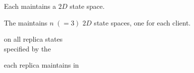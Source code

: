 \begin{frame}{}
  \centerline{\large Each  maintains a $2D$ state space.}


  \centerline{\large The  maintains $n \; (=3)$ $2D$ state spaces, one for each client.}
\end{frame}

\begin{frame}{}
  \begin{center}
    {\large {} on all replica states \\ specified by the }

    \vspace{0.20cm}
    \vspace{0.20cm}

    {\large {} each replica maintains in }
  \end{center}
\end{frame}
